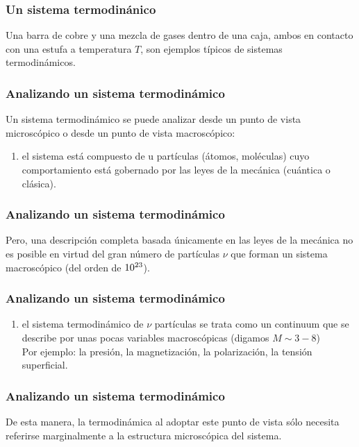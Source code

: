 \documentclass[12pt]{beamer}
\begin{document}
\begin{frame}
\frametitle{Un sistema termodinánico}
Una barra de cobre y una mezcla de gases dentro de una caja, ambos en contacto con una estufa a temperatura $T$, son ejemplos típicos de sistemas termodinámicos.
\end{frame}
\begin{frame}
\frametitle{Analizando un sistema termodinámico}
Un sistema termodinámico se puede analizar desde un punto de vista microscópico o desde un punto de vista macroscópico: \pause
{}
\begin{enumerate}[<+->]
\item {} el sistema está compuesto de u partículas (átomos, moléculas) cuyo comportamiento está gobernado por las leyes de la mecánica (cuántica o clásica).
\seti
\end{enumerate}
\end{frame}
\begin{frame}
\frametitle{Analizando un sistema termodinámico}    
Pero, una descripción completa basada únicamente en las leyes de la mecánica no es posible en virtud del gran número de partículas $\nu$ que forman un sistema macroscópico (del orden de $\num{d23}$).
\end{frame}
\begin{frame}
\frametitle{Analizando un sistema termodinámico}
\begin{enumerate}[<+->]
\conti
\item {} el sistema termodinámico de $\nu$ partículas se trata como un continuum que se describe por unas pocas variables macroscópicas (digamos $M \sim 3 - 8$)
\\[0.5em] \pause
Por ejemplo: la presión, la magnetización, la polarización, la tensión superficial.
\end{enumerate}
\end{frame}
\begin{frame}
\frametitle{Analizando un sistema termodinámico}
De esta manera, la termodinámica al adoptar este punto de vista sólo necesita referirse marginalmente a la estructura microscópica del sistema.
\end{frame}
\end{document}

